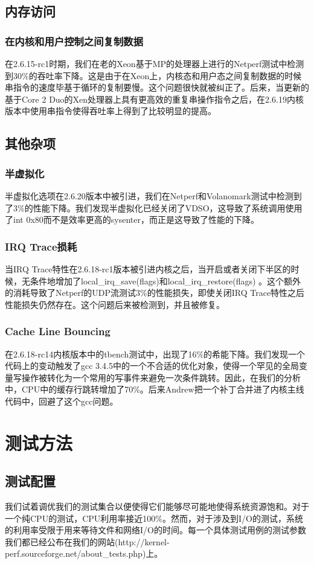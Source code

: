 \subsection{内存访问}
\subsubsection{在内核和用户控制之间复制数据}

在2.6.15-rc1时期，我们在老的Xeon基于MP的处理器上进行的Netperf测试中检测到30\%的吞吐率下降。这是由于在Xeon上，内核态和用户态之间复制数据的时候串指令的速度毕基于循环的复制要慢。这个问题很快就被纠正了。后来，当更新的基于Core 2 Duo的Xen处理器上具有更高效的重复串操作指令之后，在2.6.19内核版本中使用串指令使得吞吐率上得到了比较明显的提高。

\subsection{其他杂项}
\subsubsection{半虚拟化}
半虚拟化选项在2.6.20版本中被引进，我们在Netperf和Volanomark测试中检测到了3\%的性能下降。我们发现半虚拟化已经关闭了VDSO，这导致了系统调用使用了int 0x80而不是效率更高的sysenter，而正是这导致了性能的下降。
\subsubsection{IRQ  Trace损耗}
当IRQ Trace特性在2.6.18-rc1版本被引进内核之后，当开启或者关闭下半区的时候，无条件地增加了local\_irq\_save(flags)和local\_irq\_restore(flags) 。这个额外的消耗导致了Netperf的UDP流测试3\%的性能损失，即使关闭IRQ Trace特性之后性能损失仍然存在。这个问题后来被检测到，并且被修复。
\subsubsection{Cache Line Bouncing}
在2.6.18-rc14内核版本中的tbench测试中，出现了16\%的希能下降。我们发现一个代码上的变动触发了gcc 3.4.5中的一个不合适的优化对象，使得一个罕见的全局变量写操作被转化为一个常用的写事件来避免一次条件跳转。因此，在我们的分析中，CPU中的缓存行跳转增加了70\%。后来Andrew把一个补丁合并进了内核主线代码中，回避了这个gcc问题。


\section{测试方法}
\subsection{测试配置}
我们试着调优我们的测试集合以便使得它们能够尽可能地使得系统资源饱和。对于一个纯CPU的测试，CPU利用率接近100\%。然而，对于涉及到I/O的测试，系统的利用率受限于用来等待文件和网络I/O的时间。每一个具体测试用例的测试参数我们都已经公布在我们的网站(http://kernel-perf.sourceforge.net/about\_tests.php)上。

